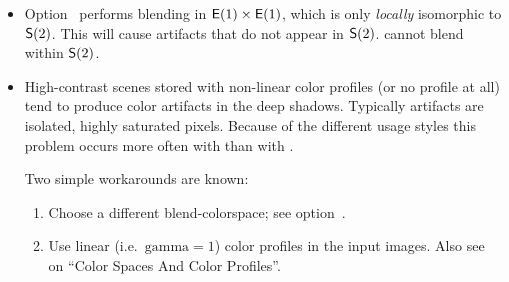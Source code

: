 \begin{itemize}
\item
  Option~ performs blending in $\mathsf{E}(1) \times \mathsf{E}(1)$,
  which is only \emph{locally} isomorphic to $\mathsf{S}(2)$.  This will cause artifacts
  that do not appear in $\mathsf{S}(2)$.  \App{} cannot blend within $\mathsf{S}(2)$.
\fi%

%
%
%
\item
  High-contrast scenes stored with non-linear color profiles (or no profile at all) tend to
  produce color artifacts in the deep shadows.  Typically artifacts are isolated, highly
  saturated pixels.  Because of the different usage styles this problem occurs more often with
   than with .

  Two simple workarounds are known:
  \begin{enumerate}
  \item
    Choose a different blend-colorspace; see
    option~.

  \item
    Use linear (i.e.\ $\mathrm{gamma} = 1$) color profiles in the input images.  Also see
    \chapterName~ on ``Color Spaces And Color Profiles''.
  \end{enumerate}
\end{itemize}



